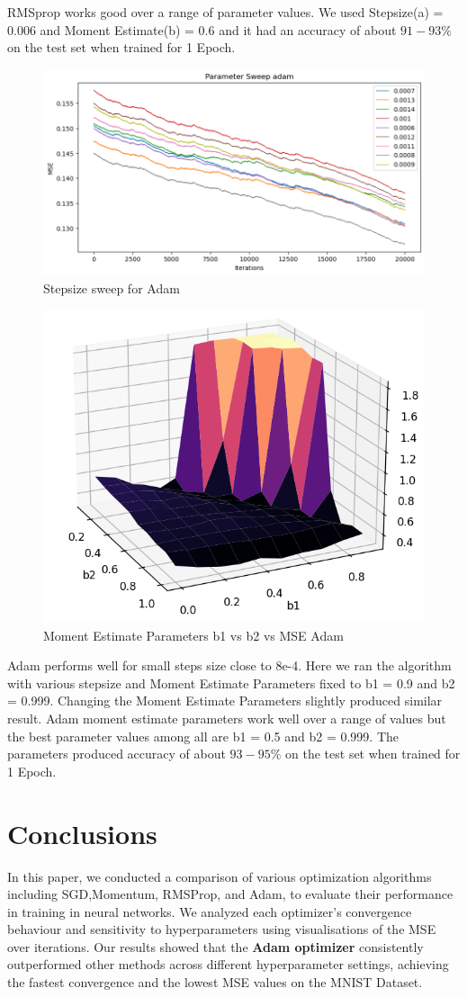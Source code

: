\documentclass{article}
\begin{document}
RMSprop works good over a range of parameter values. We used Stepsize(a) = 0.006 and  Moment Estimate(b) = 0.6 and it had an accuracy of about $91-93\%$ on the test set when trained for 1 Epoch.
\newpage
\begin{figure}[H]
    \centering
    \includegraphics[width=0.7\linewidth]{Images/adam_sweep.png}
    \caption{Stepsize sweep for Adam}
\end{figure}
\begin{figure}[H]
    \centering
    \includegraphics[width=0.7\linewidth]{Images/b1_b2_ MSE_adam.png}
    \caption{Moment Estimate Parameters b1 vs b2 vs MSE Adam}
    \label{fig:enter-label}
\end{figure}
Adam performs well for small steps size close to 8e-4. Here we ran the algorithm with various stepsize and Moment Estimate Parameters fixed to b1 = 0.9 and b2 = 0.999. Changing the Moment Estimate Parameters slightly produced similar result. Adam moment estimate parameters work well over a range of values but the best parameter values among all are b1 = 0.5 and b2 = 0.999. The parameters produced accuracy of about $93-95\%$ on the test set when trained for 1 Epoch.

\newpage
\section*{Conclusions}
In this paper, we conducted a comparison of various optimization algorithms including SGD,Momentum, RMSProp, and Adam\citep{kingma2014adam}, to evaluate their performance in training in neural networks. We analyzed each optimizer's convergence behaviour and sensitivity to hyperparameters using visualisations of the MSE over iterations. Our results showed that the \textbf{Adam optimizer} consistently outperformed other methods across different hyperparameter settings, achieving the fastest convergence and the lowest MSE values on the MNIST Dataset\citep{lecun2010mnist}.
\end{document}
